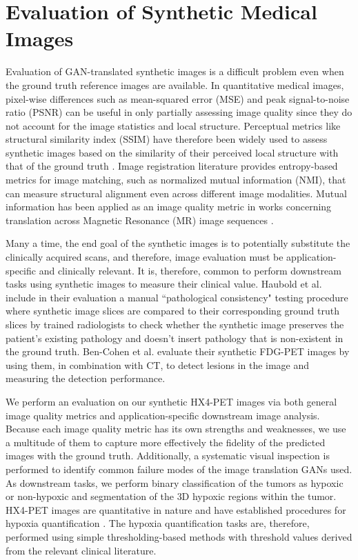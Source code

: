\section{Evaluation of Synthetic Medical Images}

Evaluation of GAN-translated synthetic images is a difficult problem even when the ground truth reference images are available. In quantitative medical images, pixel-wise differences such as mean-squared error (MSE) and peak signal-to-noise ratio (PSNR) can be useful in only partially assessing image quality since they do not account for the image statistics and local structure. Perceptual metrics like structural similarity index (SSIM) have therefore been widely used to assess synthetic images based on the similarity of their perceived local structure with that of the ground truth \cite{yi2019generative}. Image registration literature provides entropy-based metrics for image matching, such as normalized mutual information (NMI), that can measure structural alignment even across different image modalities. Mutual information has been applied as an image quality metric in works concerning translation across Magnetic Resonance (MR) image sequences \cite{yang2018mri, welander2018generative}. 

Many a time, the end goal of the synthetic images is to potentially substitute the clinically acquired scans, and therefore, image evaluation must be application-specific and clinically relevant. It is, therefore, common to perform downstream tasks using synthetic images to measure their clinical value. Haubold et al. \cite{haubold2021contrast} include in their evaluation a manual ``pathological consistency" testing procedure where synthetic image slices are compared to their corresponding ground truth slices by trained radiologists to check whether the synthetic image preserves the patient's existing pathology and doesn't insert pathology that is non-existent in the ground truth. Ben-Cohen et al. \cite{bencohen2018crossmodality} evaluate their synthetic FDG-PET images by using them, in combination with CT, to detect lesions in the image and measuring the detection performance.  

We perform an evaluation on our synthetic HX4-PET images via both general image quality metrics and application-specific downstream image analysis. Because each image quality metric has its own strengths and weaknesses, we use a multitude of them to capture more effectively the fidelity of the predicted images with the ground truth. Additionally, a systematic visual inspection is performed to identify common failure modes of the image translation GANs used. As downstream tasks, we perform binary classification of the tumors as hypoxic or non-hypoxic and segmentation of the 3D hypoxic regions within the tumor. HX4-PET images are quantitative in nature and have established procedures for hypoxia quantification \cite{zegers2013hypoxia}. The hypoxia quantification tasks are, therefore, performed using simple thresholding-based methods with threshold values derived from the relevant clinical literature.